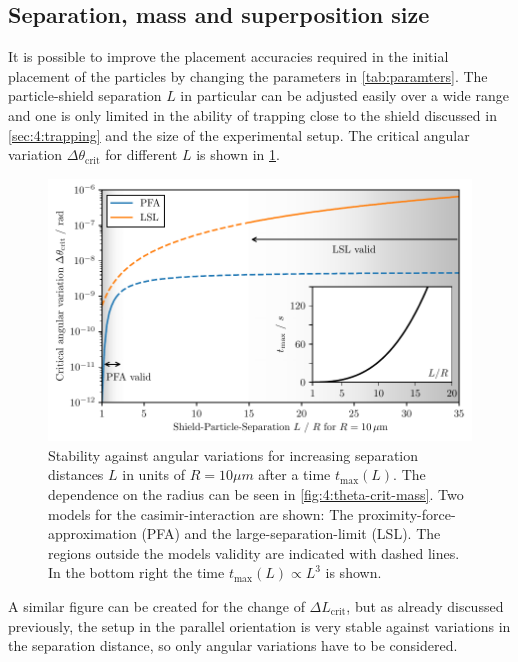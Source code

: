 \newpage
\subsection{Separation, mass and superposition size}
It is possible to improve the placement accuracies required in the initial placement of the particles by changing the parameters in \cref{tab:paramters}.
The particle-shield separation $L$ in particular can be adjusted easily over a wide range and one is only limited in the ability of trapping close to the shield discussed in \cref{sec:4:trapping} and the size of the experimental setup.
The critical angular variation $\Delta \theta_\mathrm{crit}$ for different $L$ is shown in \cref{fig:4:theta-crit-L}.
\begin{figure}[!htbp]
  \centering
  \includegraphics[width=\textwidth]{./../figures/theta-variance/theta-crit-L.pdf}
  \caption{Stability against angular variations for increasing separation distances $L$ in units of $R=10\si{\mu m}$ after a time $t_\mathrm{max}(L)$. The dependence on the radius can be seen in \cref{fig:4:theta-crit-mass}. Two models for the casimir-interaction are shown: The proximity-force-approximation (PFA) and the large-separation-limit (LSL). The regions outside the models validity are indicated with dashed lines. In the bottom right the time $t_\mathrm{max}(L) \propto L^3$ is shown.}
  \label{fig:4:theta-crit-L}
\end{figure}
A similar figure can be created for the change of $\Delta L_\mathrm{crit}$, but as already discussed previously, the setup in the parallel orientation is very stable against variations in the separation distance, so only angular variations have to be considered.

